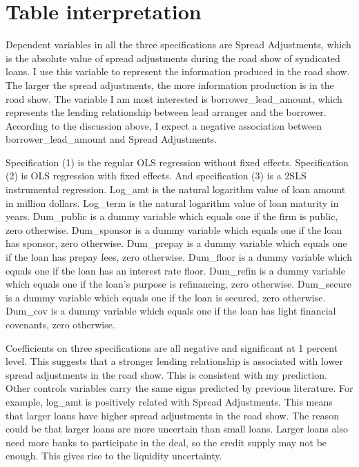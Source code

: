 \documentclass[letterpaper,12pt]{article}
\theoremstyle{definition}
\begin{document}
\section{Table interpretation}

Dependent variables in all the three specifications are Spread Adjustments, which is the absolute value of spread adjustments during the road show of syndicated loans. I use this variable to represent the information produced in the road show. The larger the spread adjustments, the more information production is in the road show. The variable I am most interested is borrower{\_}lead{\_}amount, which represents the lending relationship between lead arranger and the borrower. According to the discussion above, I expect a negative association between borrower{\_}lead{\_}amount and Spread Adjustments.

Specification (1) is the regular OLS regression without fixed effects. Specification (2) is OLS regression with fixed effects. And specification (3) is a 2SLS instrumental regression. Log{\_}amt is the natural logarithm value of loan amount in million dollars. Log{\_}term is the natural logarithm value of loan maturity in years. Dum{\_}public is a dummy variable which equals one if the firm is public, zero otherwise. Dum{\_}sponsor is a dummy variable which equals one if the loan has sponsor, zero otherwise. Dum{\_}prepay is a dummy variable which equals one if the loan has prepay fees, zero otherwise. Dum{\_}floor is a dummy variable which equals one if the loan has an interest rate floor. Dum{\_}refin is a dummy variable which equals one if the loan's purpose is refinancing, zero otherwise. Dum{\_}secure is a dummy variable which equals one if the loan is secured, zero otherwise. Dum{\_}cov is a dummy variable which equals one if the loan has light financial covenants, zero otherwise.

Coefficients on three specifications are all negative and significant at 1 percent level. This suggests that a stronger lending relationship is associated with lower spread adjustments in the road show. This is consistent with my prediction. Other controls variables carry the same signs predicted by previous literature. For example, log{\_}amt is positively related with Spread Adjustments. This means that larger loans have higher spread adjustments in the road show. The reason could be that larger loans are more uncertain than small loans. Larger loans also need more banks to participate in the deal, so the credit supply may not be enough. This gives rise to the liquidity uncertainty. 

\clearpage
{}


	
\end{document}
